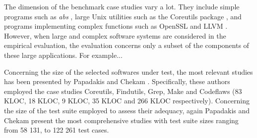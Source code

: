 The dimension of the benchmark case studies vary a lot. They include simple programs such as \textit{abs} \cite{tokumoto2016muvm}, large Unix utilities such as the Coreutils package \cite{hariri2019comparing,papadakis2018mutation,chekam2017empirical}, and programs implementing complex functions such as OpenSSL and LLVM \cite{denisov2018mull}.
However, when large and complex software systems are considered in the empirical evaluation, the evaluation concerns only a subset of the components of these large applications.
For example... 

Concerning the size of the selected softwares under test, the most relevant studies has been presented by Papadakis and Chekam \cite{papadakis2018mutation,chekam2017empirical,papadakis2018mutant}. Specifically, these authors employed the case studies Coreutils, Findutils, Grep, Make and Codeflaws (83 KLOC, 18 KLOC, 9 KLOC, 35 KLOC and 266 KLOC respectively). 
Concerning the size of the test suite employed to assess their adequacy, again Papadakis and Chekam \cite{papadakis2018mutation,chekam2017empirical,papadakis2018mutant} present the most comprehensive studies with test suite sizes ranging from 58 131, to 122 261 test cases.






